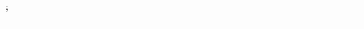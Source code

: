  \hfill
 \href{https://princetonuniversity.github.io/FOCUS/subroutines}{};
 \vspace{1mm} 
 \hrule
 
